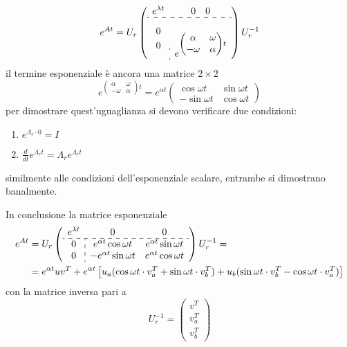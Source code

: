 $$
e^{At} = U_r \left(
\begin{array}{c:c}
e^{\lambda t} & 0 \quad 0 \\ \hdashline
\begin{aligned}
0 \\ 0
\end{aligned} &\begin{aligned} \\ e^{\begin{pmatrix}
\alpha& \omega\\
-\omega & \alpha
\end{pmatrix}t}\end{aligned}
\end{array}
\right) U_r^{-1}
$$
il termine esponenziale è ancora una matrice $2\times 2$
$$
e^{\begin{pmatrix}
\alpha& \omega\\
-\omega & \alpha
\end{pmatrix}t} =
e^{\alpha t} \begin{pmatrix}
\cos \omega t & \sin \omega t \\
-\sin \omega t & \cos \omega t
\end{pmatrix}
$$
per dimostrare quest'uguaglianza si devono verificare due condizioni:
\begin{enumerate}
 \item $e^{\Lambda_r \cdot 0} = I$
 \item $\frac{d}{dt} e^{\Lambda_r t} = \Lambda_re^{\Lambda_r t}$
\end{enumerate}
similmente alle condizioni dell'esponenziale scalare, entrambe si dimostrano
banalmente.

\newpage
In conclusione la matrice esponenziale
\begin{equation}
\begin{aligned}
e^{At} &= U_r \left(\begin{array}{c:cc}
e^{\lambda t} & 0 & 0 \\ \hdashline
0 & e^{\alpha t}\cos\omega t & e^{\alpha t}\sin\omega t \\
0 & -e^{\alpha t}\sin\omega t & e^{\alpha t}\cos\omega t
\end{array}\right)U_r^{-1} = \\
&=e^{\alpha t}uv^T + e^{\alpha t}\left[
u_a(\cos\omega t\cdot v_a^T + \sin\omega t\cdot v_b^T) +
u_b(\sin\omega t\cdot v_b^T - \cos\omega t\cdot v_a^T)
\right]
\end{aligned}
\label{eq.:esponenziale_comp_coniugata}
\end{equation}
con la matrice inversa pari a
$$
U_r^{-1} = \begin{pmatrix}
v^T \\ v_a^T \\ v_b^T
\end{pmatrix}
$$
